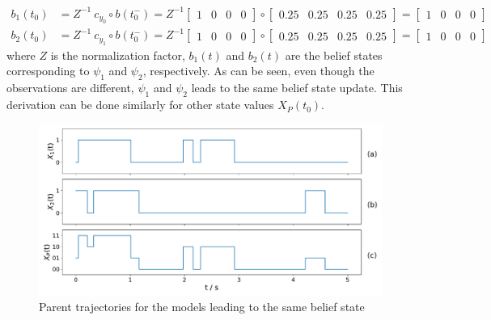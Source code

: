 \begin{align}
b_1(t_0) &= Z^{-1}\ c_{y_0} \circ b(t_0^-) = Z^{-1} \begin{bmatrix}
1 & 0 & 0 & 0\end{bmatrix} \circ \begin{bmatrix}
0.25 & 0.25 & 0.25 & 0.25 \end{bmatrix} = \begin{bmatrix}
1 & 0 & 0 & 0\end{bmatrix} \\
b_2(t_0) &= Z^{-1}\ c_{y_1} \circ b(t_0^-) = Z^{-1} \begin{bmatrix}
1 & 0 & 0 & 0\end{bmatrix} \circ \begin{bmatrix}
0.25 & 0.25 & 0.25 & 0.25 \end{bmatrix} = \begin{bmatrix}
1 & 0 & 0 & 0\end{bmatrix}
\end{align}
where $ Z $ is the normalization factor, $ b_1(t) $ and $ b_2(t) $ are the belief states corresponding to $ \psi_1 $ and $ \psi_2 $, respectively. As can be seen, even though the observations are different, $ \psi_1 $ and $ \psi_2 $ leads to the same belief state update. This derivation can be done similarly for other state values $ X_P(t_0) $.
\begin{figure}[H]
	\begin{center}
		\includegraphics[width=.90\textwidth]{figures/equivalence_classes/same_belief/parent_traj}
		\caption[Parent trajectories for the models leading to the same belief state]{Parent trajectories for the models leading to the same belief state}
		\label{fig:same_belief_parents}
	\end{center}
\end{figure}
